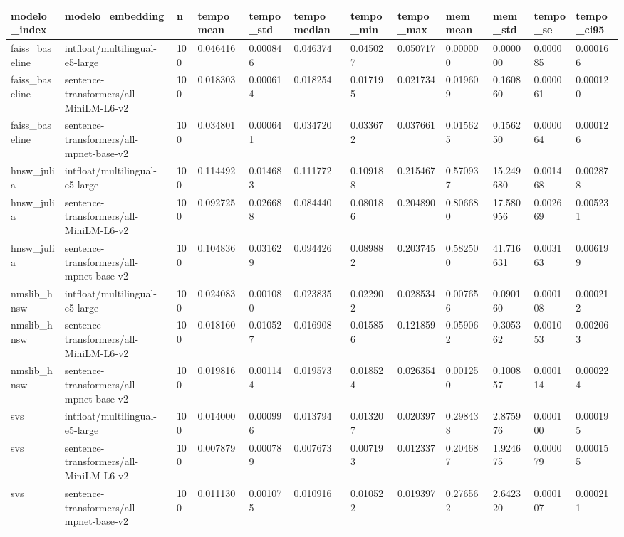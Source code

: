 \begin{tabular}{llllllllllll}
modelo_index & modelo_embedding & n & tempo_mean & tempo_std & tempo_median & tempo_min & tempo_max & mem_mean & mem_std & tempo_se & tempo_ci95 \\
\hline
faiss_baseline & intfloat/multilingual-e5-large & 100 & 0.046416 & 0.000846 & 0.046374 & 0.045027 & 0.050717 & 0.000000 & 0.000000 & 0.000085 & 0.000166 \\
faiss_baseline & sentence-transformers/all-MiniLM-L6-v2 & 100 & 0.018303 & 0.000614 & 0.018254 & 0.017195 & 0.021734 & 0.019609 & 0.160860 & 0.000061 & 0.000120 \\
faiss_baseline & sentence-transformers/all-mpnet-base-v2 & 100 & 0.034801 & 0.000641 & 0.034720 & 0.033672 & 0.037661 & 0.015625 & 0.156250 & 0.000064 & 0.000126 \\
hnsw_julia & intfloat/multilingual-e5-large & 100 & 0.114492 & 0.014683 & 0.111772 & 0.109188 & 0.215467 & 0.570937 & 15.249680 & 0.001468 & 0.002878 \\
hnsw_julia & sentence-transformers/all-MiniLM-L6-v2 & 100 & 0.092725 & 0.026688 & 0.084440 & 0.080186 & 0.204890 & 0.806680 & 17.580956 & 0.002669 & 0.005231 \\
hnsw_julia & sentence-transformers/all-mpnet-base-v2 & 100 & 0.104836 & 0.031629 & 0.094426 & 0.089882 & 0.203745 & 0.582500 & 41.716631 & 0.003163 & 0.006199 \\
nmslib_hnsw & intfloat/multilingual-e5-large & 100 & 0.024083 & 0.001080 & 0.023835 & 0.022902 & 0.028534 & 0.007656 & 0.090160 & 0.000108 & 0.000212 \\
nmslib_hnsw & sentence-transformers/all-MiniLM-L6-v2 & 100 & 0.018160 & 0.010527 & 0.016908 & 0.015856 & 0.121859 & 0.059062 & 0.305362 & 0.001053 & 0.002063 \\
nmslib_hnsw & sentence-transformers/all-mpnet-base-v2 & 100 & 0.019816 & 0.001144 & 0.019573 & 0.018524 & 0.026354 & 0.001250 & 0.100857 & 0.000114 & 0.000224 \\
svs & intfloat/multilingual-e5-large & 100 & 0.014000 & 0.000996 & 0.013794 & 0.013207 & 0.020397 & 0.298438 & 2.875976 & 0.000100 & 0.000195 \\
svs & sentence-transformers/all-MiniLM-L6-v2 & 100 & 0.007879 & 0.000789 & 0.007673 & 0.007193 & 0.012337 & 0.204687 & 1.924675 & 0.000079 & 0.000155 \\
svs & sentence-transformers/all-mpnet-base-v2 & 100 & 0.011130 & 0.001075 & 0.010916 & 0.010522 & 0.019397 & 0.276562 & 2.642320 & 0.000107 & 0.000211 \\
\end{tabular}
